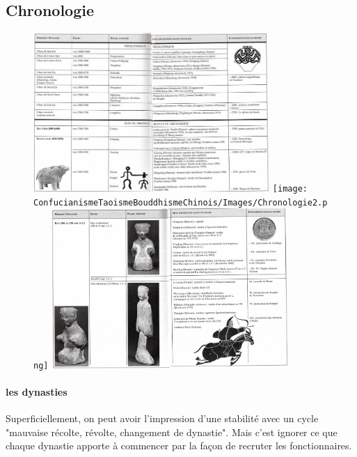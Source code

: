 \subsection{Chronologie}
\begin{figure}[!h]
    \centering
\includegraphics[width=0.8\textwidth]{ConfucianismeTaoismeBouddhismeChinois/Images/Chronologie1.jpg}
\texttt{[image: ConfucianismeTaoismeBouddhismeChinois/Images/Chronologie2.png]}
\includegraphics[width=0.8\textwidth]{ConfucianismeTaoismeBouddhismeChinois/Images/Chronologie3.png}

    \label{fig:enter-label}
\end{figure}

\FloatBarrier

\paragraph{les dynasties} Superficiellement, on peut avoir l'impression d'une stabilité avec un cycle "mauvaise récolte, révolte, changement de dynastie". Mais c'est ignorer ce que chaque dynastie apporte à commencer par la façon de recruter les fonctionnaires.


